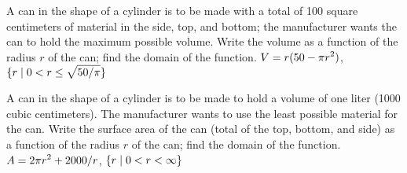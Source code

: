 \exercise A can in the shape of a cylinder is to be made with a total
of 100 square centimeters of material in the side, top, and bottom;
the manufacturer wants the can to hold the maximum possible
volume. Write the volume as a function of the radius $r$ of the can;
find the domain of the function.
\answer $\displaystyle V=r(50-\pi r^2)$, $\displaystyle \{r\mid 0< r\le \sqrt{50/\pi}\}$
\endanswer
\endexercise

\exercise A can in the shape of a cylinder is to be made to hold a
volume of one liter (1000 cubic centimeters). The manufacturer wants
to use the least possible material for the can. Write the surface area
of the can (total of the top, bottom, and side) as a function of the
radius $r$ of the can; find the domain of the function.
\answer $\displaystyle A=2\pi r^2+2000/r$, $\displaystyle \{r\mid 0<r<\infty\}$
\endanswer
\endexercise

\endexercises

